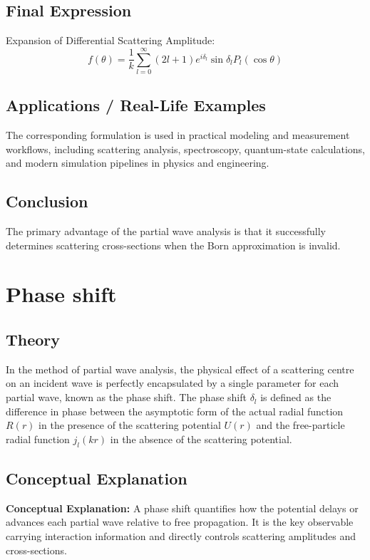 \documentclass[12pt]{report}
\begin{document}
\subsection*{Final Expression}
Expansion of Differential Scattering Amplitude:
\begin{equation}
\boxed{ f(\theta) = \frac{1}{k} \sum_{l=0}^{\infty} (2l+1) e^{i\delta_l} \sin \delta_l P_l(\cos \theta) }
\end{equation}

\subsection*{Applications / Real-Life Examples}
The corresponding formulation is used in practical modeling and measurement workflows, including scattering analysis, spectroscopy, quantum-state calculations, and modern simulation pipelines in physics and engineering.

\subsection*{Conclusion}
The primary advantage of the partial wave analysis is that it successfully determines scattering cross-sections when the Born approximation is invalid.

\section{Phase shift}



\subsection*{Theory}
In the method of partial wave analysis, the physical effect of a scattering centre on an incident wave is perfectly encapsulated by a single parameter for each partial wave, known as the phase shift. The phase shift $\delta_l$ is defined as the difference in phase between the asymptotic form of the actual radial function $R(r)$ in the presence of the scattering potential $U(r)$ and the free-particle radial function $j_l(kr)$ in the absence of the scattering potential.


\subsection{Conceptual Explanation}
\textbf{Conceptual Explanation:} A phase shift quantifies how the potential delays or advances each partial wave relative to free propagation. It is the key observable carrying interaction information and directly controls scattering amplitudes and cross-sections.
\end{document}
